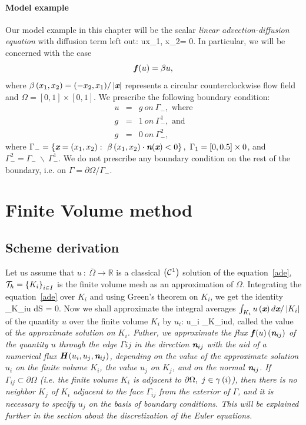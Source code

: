 \paragraph{Model example}
\label{par:model_example}
Our model example in this chapter will be the scalar \emph{linear advection-diffusion equation} with diffusion term left out:
\be
\label{ade}
\nabla \cdot {}\lo u\lo x_1, x_2\ro\ro = 0.
\ee
In particular, we will be concerned with the case 
$$\textit{\textbf{f}}\left( u \right) = \beta u,$$
where $\beta \left( x_1, x_2\right) = (-x_2, x_1) / \left|\textit{\textbf{x}}\right|$ represents a circular counterclockwise flow field and $\Omega = [0, 1] \times [0, 1]$. We prescribe the following boundary condition:
\begin{eqnarray}
u & = & g\ on\ \Gamma_-, \text{ where} \\
g & = & 1\ on\ \Gamma_-^1, \text{ and} \\
g & = & 0\ on\ \Gamma_-^2,
\end{eqnarray}
where $\Gamma_- = \left\{\bs{x} = \lo x_1, x_2\ro:\ \beta\lo x_1, x_2 \ro \cdot \bs{n}(\bs{x}) < 0\right\},\ \Gamma_1 = [0,0.5] \times {0}$, and $\Gamma_-^2 = \Gamma_-\ \backslash\ \Gamma_-^1$. We do not prescribe any boundary condition on the rest of the boundary, i.e. on $\Gamma = \partial\Omega / \Gamma_-$.
	\section{Finite Volume method}
		\subsection{Scheme derivation}
Let us assume that $u\ :\ \overline{\Omega} \rightarrow \mathbb{R}$ is a classical $\left(\mathcal{C}^1\right)$ solution of the equation~\eqref{ade}, $\mathcal{T}_h = \left\{K_i\right\}_{i\in I}$ is the finite volume mesh as an approximation of $\Omega$. Integrating the equation~\eqref{ade} over $K_i$ and using Green's theorem on $K_i$, we get the identity
\be
\int_{\partial K_i}\lo u\ro \cdot {} dS = 0.
\ee
Now we shall approximate the integral averages $\int_{K_i} u\left(\textit{\textbf{x}}\right) d\textit{\textbf{x}} / \left|K_i\right|$ of the quantity $u$ over the finite volume $K_i$ by $u_i$:
\be
u_i \approx {}\int_{K_i}u\lo{}\ro d,
\ee
called the value of \itshape the approximate solution \upshape on $K_i$. Futher, we approximate the flux $\textit{\textbf{f}}\left( u \right) \left(\textit{\textbf{n}}_{ij}\right)$ of the quantity $u$ through the edge $\Gamma{ij}$ in the direction $\textit{\textbf{n}}_{ij}$ with the aid of a \itshape numerical flux \upshape $\textit{\textbf{H}}\left( u_i, u_j, \textit{\textbf{n}}_{ij}\right)$, depending on the value of the approximate solution $u_i$ on the finite volume $K_i$, the value $u_j$ on $K_j$, and on the normal $\textit{\textbf{n}}_{ij}$.
If $\Gamma_{ij}\subset\partial\Omega$ (i.e. the finite volume $K_i$ is adjacent to $\partial\Omega,\ j\in\gamma\left( i \right)$), then there is no neighbor $K_j$ of $K_i$ adjacent to the face $\Gamma_{ij}$ from the exterior of $\Gamma$, and it is necessary to specify $u_j$ on the basis of boundary conditions. This will be explained further in the section about the discretization of the Euler equations.
